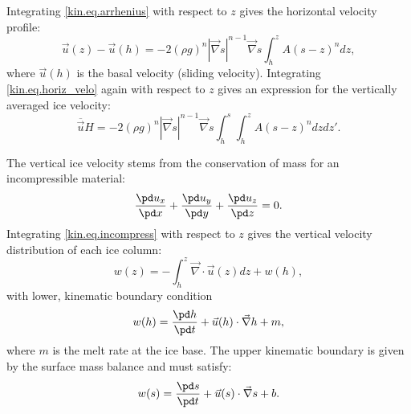 Integrating \eqref{kin.eq.arrhenius} with respect to $z$ gives the horizontal velocity profile:
\begin{equation}
  \label{kin.eq.horiz_velo}
  \vec u(z)-\vec u(h) = -2(\rho g)^n|\vec\nabla s|^{n-1}\vec\nabla s\int_h^zA(s-z)^ndz,
\end{equation}
where $\vec u(h)$ is the basal velocity (sliding velocity). Integrating \eqref{kin.eq.horiz_velo} again with respect to $z$ gives an expression for the vertically averaged ice velocity:
\begin{equation}
  \label{kin.eq.avg_velo}
  \overline{\vec u}H=-2(\rho g)^n|\vec\nabla s|^{n-1}\vec\nabla s\int_h^s\int_h^zA(s-z)^ndzdz'.
\end{equation}

The vertical ice velocity stems from the conservation of mass for an incompressible material:
\begin{equation}
  \label{kin.eq.incompress}
  \frac{\pd u_x}{\pd x} + \frac{\pd u_y}{\pd y} + \frac{\pd u_z}{\pd z} = 0.
\end{equation}
Integrating \eqref{kin.eq.incompress} with respect to $z$ gives the vertical velocity distribution of each ice column:
\begin{equation}
  \label{kin.eq.vert_velo}
  w(z)=-\int_h^z\vec\nabla\cdot\vec u(z)dz+w(h),
\end{equation}
with lower, kinematic boundary condition
\begin{equation}
  w(h)=\frac{\pd h}{\pd t}+\vec u(h)\cdot\vec\nabla h+m,
\end{equation}
where $m$ is the melt rate at the ice base. The upper kinematic boundary is given by the surface mass balance and must satisfy:
\begin{equation}
  \label{kin.eq.upper_bc}
  w(s)=\frac{\pd s}{\pd t}+\vec u(s)\cdot\vec\nabla s+b.
\end{equation}




